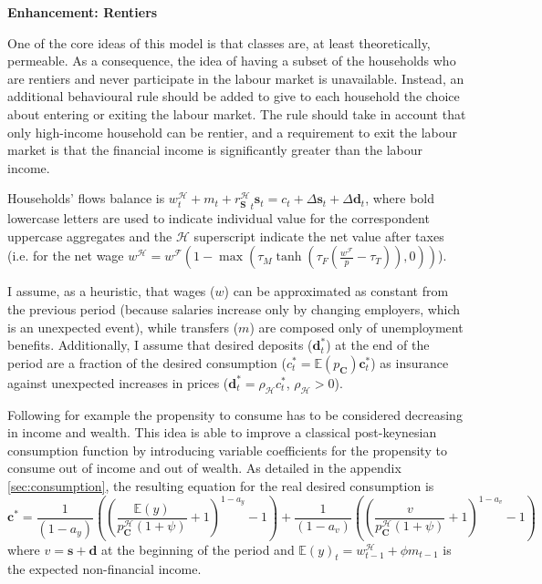 \documentclass[a4paper, headings=standardclasses]{scrartcl}
\numberwithin{equation}{subsection}
\newenvironment{enh}[1][]{\begin{framed}\noindent\textbf{Enhancement: #1}\par}{\end{framed}}
\begin{document}
\begin{enh}[Rentiers]
    One of the core ideas of this model is that classes are, at least theoretically, permeable.
    As a consequence, the idea of having a subset of the households who are rentiers and never participate in the labour market is unavailable.
    Instead, an additional behavioural rule should be added to give to each household the choice about entering or exiting the labour market.
    The rule should take in account that only high-income household can be rentier, and a requirement to exit the labour market is that the financial income is significantly greater than the labour income.
\end{enh}

Households' flows balance is $w^{\mathcal{H}}_t + m_t + {r^{\mathcal{H}}_{\mathbf{S}}}_t \mathbf{s}_t = c_t + {\Delta \mathbf{s}}_t + {\Delta \mathbf{d}}_t$, where bold lowercase letters are used to indicate individual value for the correspondent uppercase aggregates and the $\mathcal{H}$ superscript indicate the net value after taxes (i.e. for the net wage $w^\mathcal{H} = w^{\mathcal{F}} (1 - \max(\tau_M \tanh(\tau_F(\frac{w^{\mathcal{F}}}{p}-\tau_T)),0))$).

I assume, as a heuristic, that wages ($w$) can be approximated as constant from the previous period (because salaries increase only by changing employers, which is an unexpected event), while transfers ($m$) are composed only of unemployment benefits.
Additionally, I assume that desired deposits ($\mathbf{d}^*_t$) at the end of the period are a fraction of the desired consumption ($c^*_t = \mathbb{E}(p_\mathbf{C}) \mathbf{c}^*_t$) as insurance against unexpected increases in prices ($\mathbf{d}^*_t = \rho_\mathcal{H}c^*_t$, $\rho_\mathcal{H} > 0$).

Following for example \textcite{fisher2020} the propensity to consume has to be considered decreasing in income and wealth.
This idea is able to improve a classical post-keynesian consumption function by introducing variable coefficients for the propensity to consume out of income and out of wealth.
As detailed in the appendix \ref{sec:consumption}, the resulting equation for the real desired consumption is $$\mathbf{c}^* = \frac{1}{(1-a_y)}\left(\left(\frac{\mathbb{E}(y)}{p^\mathcal{H}_\mathbf{C}(1+\psi)}+1\right)^{1-a_y}-1\right) + \frac{1}{(1-a_v)}\left(\left(\frac{v}{p^\mathcal{H}_\mathbf{C}(1+\psi)}+1\right)^{1-a_v}-1\right)$$
where $v = \mathbf{s} + \mathbf{d}$ at the beginning of the period and $\mathbb{E}(y)_t = w^\mathcal{H}_{t-1} + \phi m_{t-1}$ is the expected non-financial income.
\end{document}
